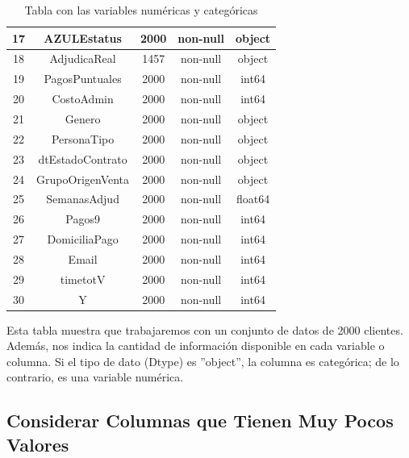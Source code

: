 \begin{table}[H]
\begin{tabular}{|c|c|c|c|c|}
            \hline
            17 &  AZULEstatus &         2000 & non-null &   object \\
            \hline
            \rowcolor{mediumgray}
            18 &  AdjudicaReal &        1457 & non-null &   object \\
            \hline
            19 &  PagosPuntuales &      2000 & non-null &   int64  \\
            \hline
            20 &  CostoAdmin &          2000 & non-null &   int64  \\
            \hline
            21 &  Genero &              2000 & non-null &   object \\
            \hline
            22 &  PersonaTipo &         2000 & non-null &   object \\
            \hline
            23 &  dtEstadoContrato &    2000 & non-null &   object \\
            \hline
            24 &  GrupoOrigenVenta &    2000 & non-null &   object \\
            \hline
            25 &  SemanasAdjud &        2000 & non-null &   float64 \\
            \hline
            26 &  Pagos9 &              2000 & non-null &   int64  \\
            \hline
            27 &  DomiciliaPago &      2000 & non-null &   int64  \\
            \hline
            28 &  Email &               2000 & non-null &   int64  \\
            \hline
            29 &  timetotV &            2000 & non-null &   int64  \\
            \hline
            30 &  Y &                   2000 & non-null &   int64 \\
            \hline  
        \end{tabular}
        \caption{Tabla con las variables numéricas y categóricas}
    \end{table} \medskip
    Esta tabla muestra que trabajaremos con un conjunto de datos de 2000 clientes. 
    Además, nos indica la cantidad de información disponible en cada variable o columna. 
    Si el tipo de dato (Dtype) es ''object'', la columna es categórica; de lo contrario, es una variable numérica.\medskip


    \subsection{ Considerar Columnas que Tienen Muy Pocos Valores}
